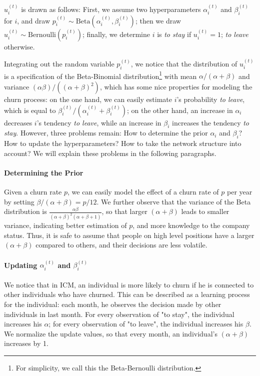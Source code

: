 \documentclass[tcn = 37075, sheet = false, abstract = false]{mcmthesis}
\begin{document}
$u_{i}^{(t)}$ is drawn as follows: First, we assume two hyperparameters $\alpha_{i}^{(t)}$ and $\beta_{i}^{(t)}$ for $i$, and draw $\displaystyle   p_{i}^{(t)} \sim \mathrm{Beta}(\alpha_{i}^{(t)}, \beta_{i}^{(t)})$; then we draw $\displaystyle u_{i}^{(t)} \sim \mathrm{Bernoulli}(p_{i}^{(t)})$; finally, we determine $i$ is \textit{to stay} if $u_{i}^{(t)}=1$; \textit{to leave} otherwise.

Integrating out the random variable $p_{i}^{(t)}$, we notice that the distribution of $u_{i}^{(t)}$ is a specification of the Beta-Binomial distribution\footnote{For simplicity, we call this the Beta-Bernoulli distribution.} with mean $\alpha / (\alpha + \beta)$ and variance $(\alpha\beta)/((\alpha+\beta)^2)$, which has some nice properties for modeling the churn process: on the one hand, we can easily estimate $i$'s probability \textit{to leave}, which is equal to $\beta_{i}^{(t)} /(\alpha_{i}^{(t)}+\beta_{i}^{(t)})$; on the other hand, an increase in $\alpha_i$ decreases $i$'s tendency \textit{to leave}, while an increase in $\beta_i$ increases the tendency \textit{to stay}. However, three problems remain: How to determine the prior $\alpha_i$ and $\beta_i$? How to update the hyperparameters? How to take the network structure into account? 
We will explain these problems in the following paragraphs.

\paragraph{Determining the Prior} Given a churn rate $p$, we can easily model the effect of a churn rate of $p$ per year by setting $\beta / (\alpha + \beta) = p / 12$. We further observe that the variance of the Beta distribution is $\displaystyle \frac{\alpha\beta}{(\alpha+\beta)^2(\alpha+\beta+1)}$, so that larger $(\alpha + \beta)$ leads to smaller variance, indicating better estimation of $p$, and more knowledge to the company status. Thus, it is safe to assume that people on high level positions have a larger $(\alpha+\beta)$ compared to others, and their decisions are less volatile.

\paragraph{Updating $\alpha_i^{(t)}$ and $\beta_i^{(t)}$} We notice that in ICM, an individual is more likely to churn if he is connected to other individuals who have churned. This can be described as a learning process for the individual: each month, he observes the decision made by other individuals in last month. For every observation of "to stay", the individual increases his $\alpha$; for every observation of "to leave", the individual increases his $\beta$. We normalize the update values, so that every month, an individual's $(\alpha+\beta)$ increases by 1.
\end{document}
